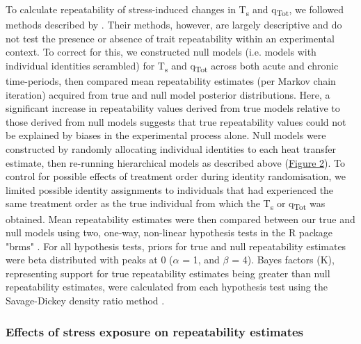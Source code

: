 \documentclass[12pt]{article}
\begin{document}
\noindent To calculate repeatability of stress-induced changes in T\textsubscript{s} and q\textsubscript{Tot}, we followed methods described by \citet{araya_2015}. Their methods, however, are largely descriptive and do not test the presence or absence of trait repeatability within an experimental context. To correct for this, we constructed null models (i.e. models with individual identities scrambled) for T\textsubscript{s} and q\textsubscript{Tot} across both acute and chronic time-periods, then compared mean repeatability estimates (per Markov chain iteration) acquired from true and null model posterior distributions. Here, a significant increase in repeatability values derived from true models relative to those derived from null models suggests that true repeatability values could not be explained by biases in the experimental process alone. Null models were constructed by randomly allocating individual identities to each heat transfer estimate, then re-running hierarchical models as described above (\hyperref[Fig4.2]{Figure 2}). To control for possible effects of treatment order during identity randomisation, we limited possible identity assignments to individuals that had experienced the same treatment order as the true individual from which the T\textsubscript{s} or q\textsubscript{Tot} was obtained. Mean repeatability estimates were then compared between our true and null models using two, one-way, non-linear hypothesis tests in the R package "brms" \citep{burkner_2017}. For all hypothesis tests, priors for true and null repeatability estimates were beta distributed with peaks at 0 ($\alpha$ = 1, and $\beta$ = 4). Bayes factors (K), representing support for true repeatability estimates being greater than null repeatability estimates, were calculated from each hypothesis test using the Savage-Dickey density ratio method \citep{wagenmakers_2010}.\vspace{0.5cm}  

\subsubsection{Effects of stress exposure on repeatability estimates}
\vspace{0.5cm}
\end{document}

